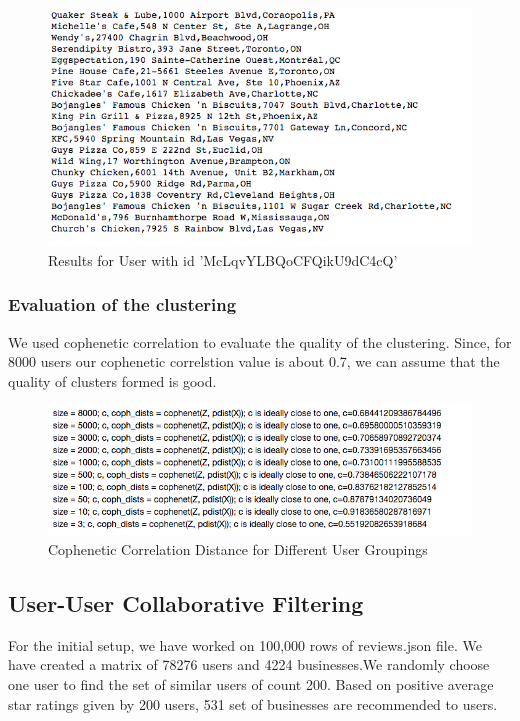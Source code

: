\documentclass[11pt]{article}
\begin{document}
	\begin{figure}[H]
		\centering
		\includegraphics[scale=0.7]{results_cl.png}
		\caption{Results for User with id 'McLqvYLBQoCFQikU9dC4cQ'}
	\end{figure}
	
	\subsubsection{Evaluation of the clustering}
	We used cophenetic correlation to evaluate the quality of the clustering. Since, for 8000 users our cophenetic correlstion value is about 0.7, we can assume that the quality of clusters formed is good.  
	\begin{figure}[H]
		\centering
		\includegraphics[scale=0.7]{eval_cl.png}
		\caption{Cophenetic Correlation Distance for Different User Groupings}
	\end{figure}
	\subsection{User-User Collaborative Filtering}

	For the initial setup, we have worked on 100,000 rows of reviews.json file. We have created a matrix of 78276 users and 4224 businesses.We randomly choose one user to find the set of similar users of count 200. Based on positive average star ratings given by 200 users, 531 set of businesses are recommended to users.
	
\end{document}
